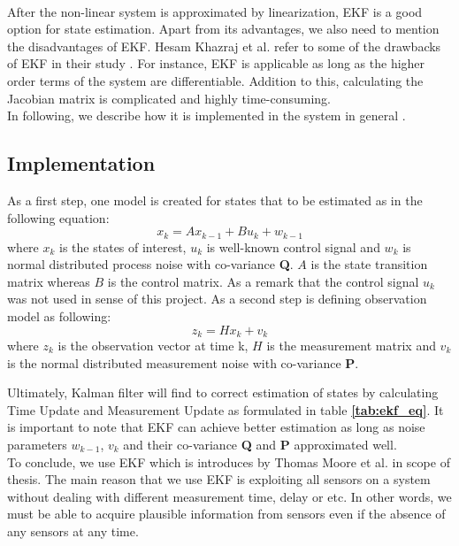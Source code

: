 \\ After the non-linear system is approximated by linearization, EKF is a good option for state estimation. Apart from its advantages, we also need to mention the disadvantages of EKF. Hesam Khazraj et al. refer to some of the drawbacks of EKF in their study \cite{kalman5}. For instance, EKF is applicable as long as the higher order terms of the system are differentiable. Addition to this, calculating the Jacobian matrix is complicated and highly time-consuming.
\\ In following, we describe how it is implemented in the system in general \cite{kalman4}.  

\subsection*{Implementation}
As a first step, one model is created for states that to be estimated as in the following equation:
\begin{equation}
     x_k = Ax_{k-1}+Bu_k+w_{k-1}
\end{equation}
where $x_k$ is the states of interest, $u_k$ is well-known control signal and $w_k$ is normal distributed process noise with co-variance \textbf{Q}. $A$ is the state transition matrix whereas $B$ is the control matrix. As a remark that the control signal $u_k$ was not used in sense of this project. As a second step is defining observation model as following:
\begin{equation}
    z_k = Hx_k+v_k
\end{equation}
where $z_k$ is the observation vector at time k, $H$ is the measurement matrix and $v_k$ is the normal distributed measurement noise with co-variance \textbf{P}.
\\ 
\par Ultimately, Kalman filter will find to correct estimation of states by calculating Time Update and Measurement Update as formulated in table \textbf{\ref{tab:ekf_eq}}. It is important to note that EKF can achieve better estimation as long as noise parameters $w_{k-1}$, $v_k$ and their co-variance \textbf{Q} and \textbf{P} approximated well. 
\\ To conclude, we use EKF which is introduces by Thomas Moore et al. \cite{kalman4} in scope of thesis. The main reason that we use EKF is exploiting all sensors on a system without dealing with different measurement time, delay or etc\cite{kalman6}. In other words, we must be able to acquire plausible information from sensors even if the absence of any sensors at any time.
\newpage
